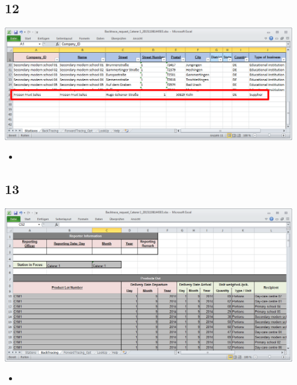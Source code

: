 \documentclass{beamer}
\begin{document}
\subsection{12}
\begin{frame}
	\begin{center}
  		\includegraphics[width=0.95\textwidth]{12.png}
	\end{center}
	\begin{itemize}
		\item
	\end{itemize}
\end{frame}

\subsection{13}
\begin{frame}
	\begin{center}
  		\includegraphics[width=0.95\textwidth]{13.png}
	\end{center}
	\begin{itemize}
		\item
	\end{itemize}
\end{frame}
\end{document}
